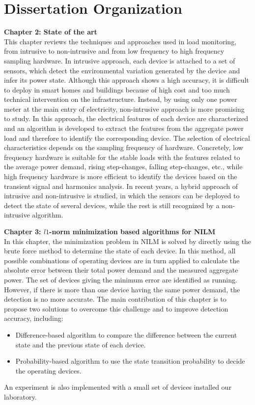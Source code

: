 \section{Dissertation Organization}

\textbf{Chapter 2: State of the art}\\
This chapter reviews the techniques and approaches used in load monitoring, from intrusive to non-intrusive and from low frequency to high frequency sampling hardware. 
In intrusive approach, each device is attached to a set of sensors, which detect the environmental variation generated by the device and infer its power state. Although this approach shows a high accuracy, it is difficult to deploy in smart homes and buildings because of high cost and too much technical intervention on the infrastructure. 
Instead, by using only one power meter at the main entry of electricity, non-intrusive approach is more promising to study. In this approach, the electrical features of each device are characterized and an algorithm is developed to extract the features from the aggregate power load and therefore to identify the corresponding device.
The selection of electrical characteristics depends on the sampling frequency of hardware. Concretely, low frequency hardware is suitable for the stable loads with the features related to the average power demand, rising step-changes, falling step-changes, etc., while high frequency hardware is more efficient to identify the devices based on the transient signal and harmonics analysis. 
In recent years, a hybrid approach of intrusive and non-intrusive is studied, in which the sensors can be deployed to detect the state of several devices, while the rest is still recognized by a non-intrusive algorithm.

\textbf{Chapter 3: $l1$-norm minimization based algorithms for NILM}\\
In this chapter, the minimization problem in NILM is solved by directly using the brute force method to determine the state of each device. In this method, all possible combinations of operating devices are in turn applied to calculate the absolute error between their total power demand and the measured aggregate power. The set of devices giving the minimum error are identified as running. However, if there is more than one device having the same power demand, the detection is no more accurate. The main contribution of this chapter is to propose two solutions to overcome this challenge and to improve detection accuracy, including:
\begin{itemize}
\item Difference-based algorithm to compare the difference between the current state and the previous state of each device.
\item Probability-based algorithm to use the state transition probability to decide the operating devices.
\end{itemize}
An experiment is also implemented with a small set of devices installed our laboratory.

